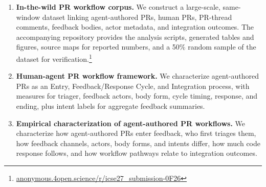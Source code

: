 \documentclass[10pt,conference,anonymous]{IEEEtran}
\begin{document}
\begin{enumerate}
    \item \textbf{In-the-wild PR workflow corpus.} We construct a large-scale, same-window dataset linking agent-authored PRs, human PRs, PR-thread comments, feedback bodies, actor metadata, and integration outcomes.
    The accompanying repository provides the analysis scripts, generated tables and figures, source maps for reported numbers, and a 50\% random sample of the dataset for verification.\footnote{\url{anonymous.4open.science/r/icse27_submission-0F26}}
    \item \textbf{Human-agent PR workflow framework.} We characterize agent-authored PRs as an Entry, Feedback/Response Cycle, and Integration process, with measures for triager, feedback actors, body form, cycle timing, response, and ending, plus intent labels for aggregate feedback summaries.
    \item \textbf{Empirical characterization of agent-authored PR workflows.} We characterize how agent-authored PRs enter feedback, who first triages them, how feedback channels, actors, body forms, and intents differ, how much code response follows, and how workflow pathways relate to integration outcomes.
\end{enumerate}
\end{document}
